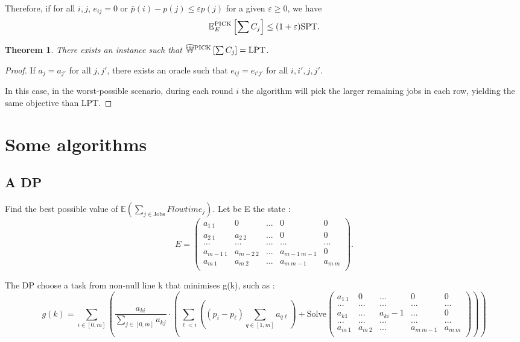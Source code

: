 \documentclass{article}
\newtheorem{theorem}{Theorem}
\begin{document}
Therefore, if for all \(i,j\), \(e_{ij}=0\) or \(\bar{p}(i)-p(j)\le\varepsilon p(j)\) for a given \(\varepsilon\ge 0\), we have
\[
    \mathbb{E}^{\text{PICK}}_E\left[\sum C_j\right]\le (1+\varepsilon)\text{SPT}.
\]


\begin{theorem}
    There exists an instance such that \(\widehat{\mathbb{W}}^{\text{PICK}}\left[\sum C_j\right]=\text{LPT}\).
\end{theorem}
\begin{proof}
    If \(a_j=a_{j'}\) for all \(j,j'\), there exists an oracle such that \(e_{ij}=e_{i'j'}\) for all \(i,i',j,j'\).

    In this case, in the worst-possible scenario, during each round \(i\) the algorithm will pick the larger remaining jobs in each row, yielding the same objective than LPT.
\end{proof}

\newpage
\section{Some algorithms}
\subsection{A DP}\label{DP}
Find the best possible value of $\mathbb{E}(\sum_{j\in\text{Jobs}}Flowtime_j)$. Let be E the state : \[
        E=\begin{pmatrix}
            a_{1\ 1} & 0 & ...& 0 & 0\\
            a_{2\ 1} & a_{2\ 2} & ...& 0 & 0 \\
            ... & ... & ... & ... & ...\\
			a_{m-1\ 1} & a_{m-2\ 2} & ...& a_{m-1\ m-1} & 0 \\	
			a_{m\ 1} & a_{m\ 2} & ... & a_{m\ m-1}& a_{m\ m} \\
        \end{pmatrix}.
    \]

The DP choose a task from non-null line k that minimises g(k), such as : $$
g(k) = \sum_{ i \in [0,m] } \left(\frac{a_{ki}}{\sum_{ j \in [0,m] } a_{kj}}\cdot \left(\sum_{\ell<i}\left(\left(p_i-p_\ell\right)\sum_{q\in[1,m]}a_{q\ell}  \right) + \text{Solve} \begin{pmatrix}
            a_{1\ 1} & 0 & ...& 0 & 0\\
            ... & ... & ... & ... & ...\\
			a_{k1} & ... & a_{ki} -1& ... & 0 \\
			... & ... & ... & ... & ...\\
			a_{m\ 1} & a_{m\ 2} & ... & a_{m\ m-1}& a_{m\ m} \\
        \end{pmatrix}\right)\right)
$$
\end{document}
